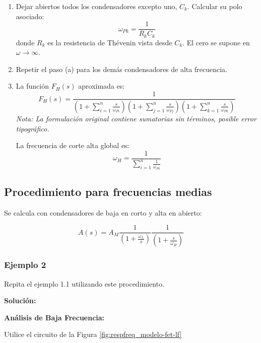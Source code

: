 \begin{enumerate}
	\item[\textbf{a)}] Dejar abiertos todos los condensadores excepto uno, \( C_k \). Calcular su polo asociado:
	\begin{equation}
		\omega_{Pk} = \frac{1}{R_k C_k}
	\end{equation}
	donde \( R_k \) es la resistencia de Thévenin vista desde \( C_k \). El cero se supone en \( \omega \to \infty \).
	
	\item[\textbf{b)}] Repetir el paso (a) para los demás condensadores de alta frecuencia.
	
	\item[\textbf{c)}] La función \( F_H(s) \) aproximada es:
	\begin{equation}
		F_H(s) = \frac{1}{\left(1 + \sum_{i=1}^n \frac{s}{\omega_{Pi}}\right)\left(1 + \sum_{j=1}^n \frac{s}{\omega_{Pj}}\right)\left(1 + \sum_{k=1}^n \frac{s}{\omega_{Pk}}\right)}
	\end{equation}
	\textit{Nota: La formulación original contiene sumatorias sin términos, posible error tipográfico.}
	
	La frecuencia de corte alta global es:
	\begin{equation}
		\omega_H = \frac{1}{\sum_{i=1}^n \frac{1}{\omega_{Pi}}}
	\end{equation}
\end{enumerate}

\subsection{Procedimiento para frecuencias medias}

Se calcula con condensadores de baja en corto y alta en abierto:

\begin{equation}
	A(s) = A_M \frac{1}{\left(1 + \frac{\omega_L}{s}\right)} \frac{1}{\left(1 + \frac{s}{\omega_H}\right)}
\end{equation}

\subsubsection{Ejemplo 2} \label{respfreq_ejm2}
Repita el ejemplo 1.1 utilizando este procedimiento.

\textbf{Solución:}

\textbf{Análisis de Baja Frecuencia:}

Utilice el circuito de la Figura \ref{fig:respfreq_modelo-fet-lf}

